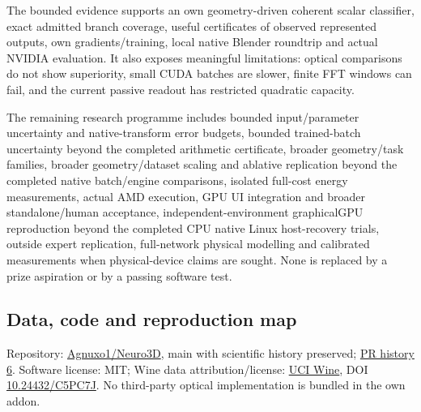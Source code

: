 \documentclass[
  10pt,
]{article}
\begin{document}
The bounded evidence supports an own geometry-driven coherent scalar
classifier, exact admitted branch coverage, useful certificates of
observed represented outputs, own gradients/training, local native
Blender roundtrip and actual NVIDIA evaluation. It also exposes
meaningful limitations: optical comparisons do not show superiority,
small CUDA batches are slower, finite FFT windows can fail, and the
current passive readout has restricted quadratic capacity.

The remaining research programme includes bounded input/parameter
uncertainty and native-transform error budgets, bounded trained-batch
uncertainty beyond the completed arithmetic certificate, broader
geometry/task families, broader geometry/dataset scaling and ablative
replication beyond the completed native batch/engine comparisons,
isolated full-cost energy measurements, actual AMD execution, GPU UI
integration and broader standalone/human acceptance,
independent-environment graphicalGPU reproduction beyond the completed
CPU native Linux host-recovery trials, outside expert replication,
full-network physical modelling and calibrated measurements when
physical-device claims are sought. None is replaced by a prize
aspiration or by a passing software test.

\hypertarget{data-code-and-reproduction-map}{%
\subsection{Data, code and reproduction
map}\label{data-code-and-reproduction-map}}

Repository: \href{https://github.com/Agnuxo1/Neuro3D}{Agnuxo1/Neuro3D},
main with scientific history preserved;
\href{https://github.com/Agnuxo1/Neuro3D/pull/6}{PR history 6}. Software
license: MIT; Wine data attribution/license:
\href{https://archive.ics.uci.edu/dataset/109/wine}{UCI Wine}, DOI
\href{https://doi.org/10.24432/C5PC7J}{10.24432/C5PC7J}. No third-party
optical implementation is bundled in the own addon.
\end{document}
